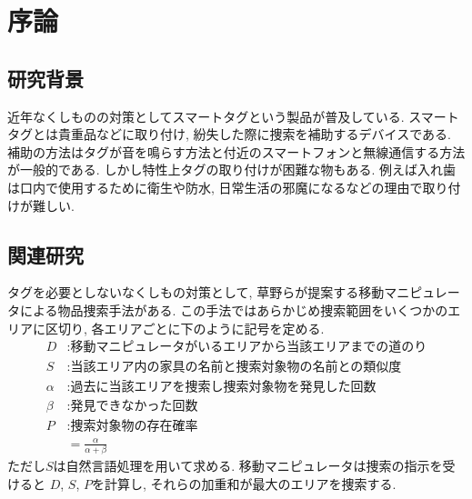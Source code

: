 \chapter{序論}

\section{研究背景}
近年なくしものの対策としてスマートタグという製品が普及している. 
スマートタグとは貴重品などに取り付け, 紛失した際に捜索を補助するデバイスである. 
補助の方法はタグが音を鳴らす方法と付近のスマートフォンと無線通信する方法が一般的である. 
しかし特性上タグの取り付けが困難な物もある. 
例えば入れ歯は口内で使用するために衛生や防水, 日常生活の邪魔になるなどの理由で取り付けが難しい. 

\section{関連研究}
タグを必要としないなくしもの対策として, 草野らが提案する移動マニピュレータによる物品捜索手法\cite{kusano}がある. 
この手法ではあらかじめ捜索範囲をいくつかのエリアに区切り, 各エリアごとに下のように記号を定める. 
\begin{align*}
    D      &: \text{移動マニピュレータがいるエリアから当該エリアまでの道のり} \\
    S      &: \text{当該エリア内の家具の名前と捜索対象物の名前との類似度} \\
    \alpha &: \text{過去に当該エリアを捜索し捜索対象物を発見した回数} \\
    \beta  &: \text{発見できなかった回数} \\
    P      &: \text{捜索対象物の存在確率} \\
           &= \frac{\alpha}{\alpha + \beta}
\end{align*}
ただし$S$は自然言語処理を用いて求める. 
移動マニピュレータは捜索の指示を受けると
$D$, $S$, $P$を計算し, それらの加重和が最大のエリアを捜索する. 

